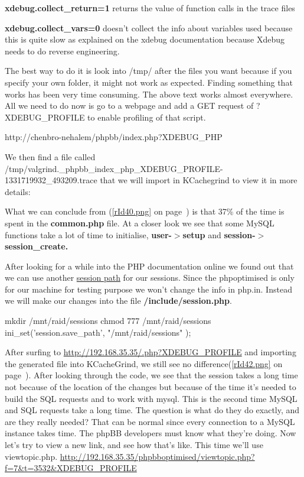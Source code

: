 \textbf{xdebug.collect\_return=1 }returns the value of function calls in the trace files

\textbf{xdebug.collect\_vars=0} doesn't collect the info about variables used because this is quite slow as explained on the xdebug documentation because Xdebug needs to do reverse engineering.

The best way to do it is look into /tmp/ after the files you want because if you specify your own folder, it might not work as expected. Finding something that works has been very time consuming. The above text works almost everywhere. All we need to do now is go to a webpage and add a GET request of ?XDEBUG\_PROFILE to enable profiling of that script\cite{diagnose_php_with_xdebug}.
\begin{codelisting}
http://chenbro-nehalem/phpbb/index.php?XDEBUG_PHP
\end{codelisting}

We then find a file called /tmp/valgrind.\_phpbb\_index\_php\_XDEBUG\allowbreak{}\_PROFILE-1331719932\allowbreak{}\_493209.trace that we will import in KCachegrind to view it in more details:

What we can conclude from (\autoref{rId40.png} on page~\pageref{rId40.png}) is that 37\% of the time is spent in the \textbf{common.php} file.
At a closer look we see that some MySQL functions take a lot of time to initialise, \textbf{user-$>$setup} and \textbf{session-$>$session\_create.}

After looking for a while into the PHP documentation online\cite{php_session} we found out that we can use another \underline{session path} for our sessions. Since the phpoptimised is only for our machine for testing purpose we won't change the info in php.in. Instead we will make our changes into the file \textbf{/include/session.php}.
\begin{codelisting}
mkdir /mnt/raid/sessions
chmod 777 /mnt/raid/sessions
ini_set('session.save_path', "/mnt/raid/sessions" );
\end{codelisting}

After surfing to \url{http://192.168.35.35/.php?XDEBUG_PROFILE} and importing the generated file into KCacheGrind, we still see no difference(\autoref{rId42.png} on page~\pageref{rId42.png}).
After looking through the code, we see that the session takes a long time not because of the location of the changes but because of the time it's needed to build the SQL requests and to work with \gls{mysql}. This is the second time MySQL and SQL requests take a long time. The question is what do they do exactly, and are they really needed? That can be normal since every connection to a MySQL instance takes time. The phpBB developers must know what they're doing.
Now let's try to view a new link, and see how that's like. This time we'll use viewtopic.php.
\url{http://192.168.35.35/phpbboptimised/viewtopic.php?f=7&t=3532&XDEBUG_PROFILE}


